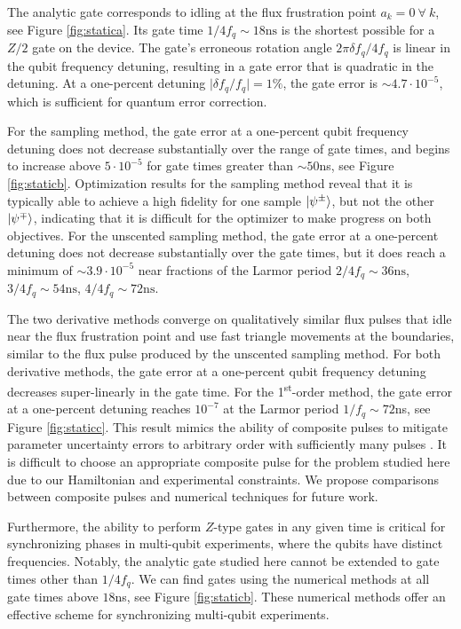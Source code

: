 The analytic gate corresponds to
idling at the flux frustration point $a_{k} = 0 \ \forall \ k$, see Figure
\ref{fig:statica}. Its gate time $1 / 4 f_{q} \sim 18\textrm{ns}$
is the shortest possible for a $Z/2$ gate on the device.
The gate's erroneous rotation angle
$2 \pi \delta f_{q} / 4 f_{q}$ is linear in the
qubit frequency detuning, resulting in a gate error that is quadratic
in the detuning.
At a one-percent detuning $\lvert \delta f_{q} / f_{q} \rvert = 1\%$,
the gate error is $\sim 4.7 \cdot 10^{-5}$,
which is sufficient for quantum error correction.

For the sampling method, the gate error at a one-percent qubit frequency detuning
does not decrease substantially over the
range of gate times, and begins to increase above $5 \cdot 10^{-5}$ for gate times
greater than $\sim 50$ns, see Figure \ref{fig:staticb}.
Optimization results for the sampling method reveal that it is typically
able to achieve a high fidelity for
one sample $\ket{\psi^{\pm}}$,
but not the other $\ket{\psi^{\mp}}$, indicating that it is difficult for the optimizer
to make progress on both objectives.
For the unscented sampling method,
the gate error at a one-percent detuning
does not decrease substantially 
over the gate times, but it does reach
a minimum of $\sim 3.9 \cdot 10^{-5}$
near fractions of the Larmor period $2/4f_{q} \sim 36\textrm{ns}$,
$3/4f_{q} \sim 54\textrm{ns}$, $4/4f_{q} \sim 72\textrm{ns}$.

The two derivative methods converge on qualitatively similar flux pulses that
idle near the flux frustration point and use fast triangle movements at the boundaries,
similar to the flux pulse produced by the unscented sampling method.
For both derivative methods, the gate error at a one-percent qubit frequency detuning
decreases super-linearly in the gate time.
For the 1\textsuperscript{st}-order method, the gate error at a one-percent detuning 
reaches $10^{-7}$ at the Larmor period $1 / f_{q} \sim 72$ns,
see Figure \ref{fig:staticc}.
This result mimics the
ability of composite pulses to mitigate parameter uncertainty errors to arbitrary
order with sufficiently many pulses \cite{merrill2014progress}.
It is difficult to choose an appropriate composite pulse
for the problem studied here due to our Hamiltonian and experimental constraints.
We propose comparisons between composite pulses and numerical techniques
for future work.

Furthermore, the ability to perform
$Z$-type gates in any given time is critical
for synchronizing phases in multi-qubit experiments,
where the qubits have distinct
frequencies. Notably, the analytic gate studied here cannot be extended
to gate times other than $1 / 4 f_{q}$. 
We can find gates using the numerical methods at
all gate times above $18$ns, see Figure \ref{fig:staticb}.
These numerical methods offer an effective scheme for synchronizing
multi-qubit experiments.
